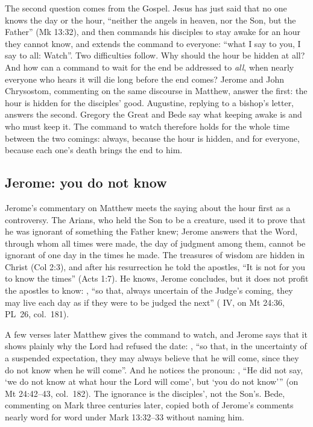 \label{sec:watch-at-the-door}

The second question comes from the Gospel. Jesus has just said that no one
knows the day or the hour, ``neither the angels in heaven, nor the Son, but
the Father'' (Mk 13:32), and then commands his disciples to stay awake for
an hour they cannot know, and extends the command to everyone: ``what I say to
you, I say to all: Watch''. Two difficulties follow. Why should the hour be
hidden at all? And how can a command to wait for the end be addressed to
\emph{all}, when nearly everyone who hears it will die long before the end
comes? Jerome and John Chrysostom, commenting on the same discourse in
Matthew, answer the first: the hour is hidden for the disciples' good.
Augustine, replying to a bishop's letter, answers the second. Gregory the
Great and Bede say what keeping awake is and who must keep it. The command
to watch therefore holds for the whole time between the two comings: always, because the hour is hidden, and for everyone, because
each one's death brings the end to him.

\subsection{Jerome: you do not know}

Jerome's commentary on Matthew meets the
saying about the hour first as a controversy. The Arians, who held the Son to
be a creature, used it to prove that he was ignorant of something the Father
knew; Jerome answers that the Word, through whom all times were made, the day
of judgment among them, cannot be ignorant of one day in the times he made.
The treasures of wisdom are hidden in Christ (Col 2:3), and after his
resurrection he told the apostles, ``It is not for you to know the times''
(Acts 1:7). He knows, Jerome concludes, but it does not profit the apostles to
know: , ``so that, always uncertain of the Judge's coming,
they may live each day as if they were to be judged the next''
( IV, on Mt 24:36, PL~26, col.~181).

A few verses later Matthew gives the command to watch, and Jerome says that it
shows plainly why the Lord had refused the date: , ``so that, in the uncertainty of a suspended expectation, they
may always believe that he will come, since they do not know when he will
come''. And he notices the pronoun: , ``He did not say, `we do not know
at what hour the Lord will come', but `you do not know''' (on Mt 24:42--43,
col.~182). The ignorance is the disciples', not the Son's. Bede, commenting
on Mark three centuries later, copied both of Jerome's comments nearly word
for word under Mark 13:32--33 without naming him.

